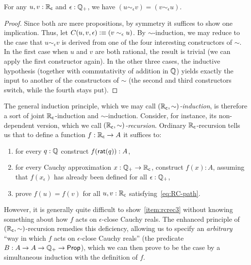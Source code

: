 \begin{lem}\label{thm:RCsim-symmetric}
  For any $u,v:\mathbb{R}_\mathsf{c}$ and $\epsilon:\mathbb{Q}_{+}$, we have $(u\sim_\epsilon v) = (v\sim_\epsilon u)$.
\end{lem}
\begin{proof}
  Since both are mere propositions, by symmetry it suffices to show one implication.
  Thus, let $C(u,v,\epsilon) \vcentcolon\equiv (v\sim_\epsilon u)$.
  By $\sim$-induction, we may reduce to the case that $u\sim_\epsilon v$ is derived from one of the four interesting constructors of $\sim$.
  In the first case when $u$ and $v$ are both rational, the result is trivial (we can apply the first constructor again).
  In the other three cases, the inductive hypothesis (together with commutativity of addition in $\mathbb{Q}$) yields exactly the input to another of the constructors of $\sim$ (the second and third constructors switch, while the fourth stays put).
\end{proof}

The general induction principle, which we may call \emph{$(\mathbb{R}_\mathsf{c},\sim)$-induction}, is therefore a sort of joint $\mathbb{R}_\mathsf{c}$-induction and $\sim$-induction.
Consider, for instance, its non-dependent version, which we call \emph{$(\mathbb{R}_\mathsf{c},\sim)$-recursion}.
Ordinary $\mathbb{R}_\mathsf{c}$-recursion tells us that to define a function $f : \mathbb{R}_\mathsf{c} \to A$ it suffices to:
\begin{enumerate}
\item for every $q : \mathbb{Q}$ construct $f(\mathsf{rat}(q)) : A$,
\item for every Cauchy approximation $x : \mathbb{Q}_{+} \to \mathbb{R}_\mathsf{c}$, construct $f(x) : A$,
  assuming that $f(x_\epsilon)$ has already been defined for all $\epsilon : \mathbb{Q}_{+}$,
\item prove $f(u) = f(v)$ for all $u, v : \mathbb{R}_\mathsf{c}$ satisfying~\eqref{eq:RC-path}.\label{item:rcrec3}
\end{enumerate}
However, it is generally quite difficult to show~\ref{item:rcrec3} without knowing something about how $f$ acts on $\epsilon$-close Cauchy reals.
The enhanced principle of $(\mathbb{R}_\mathsf{c},\sim)$-recursion remedies this deficiency, allowing us to specify an \emph{arbitrary} ``way in which $f$ acts on $\epsilon$-close Cauchy reals'' (the predicate $B:A\to A\to \mathbb{Q}_{+}\to\mathsf{Prop}$), which we can then prove to be the case by a simultaneous induction with the definition of $f$.

